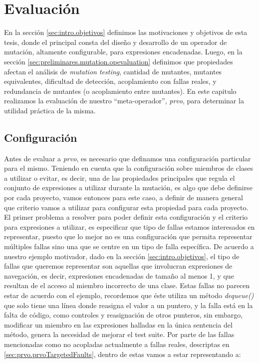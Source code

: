 \chapter[Evaluaci\'on]{Evaluaci\'on}
\label{cap:evaluation}

En la secci\'on \ref{sec:intro.objetivos} definimos las motivaciones y objetivos de esta tesis, donde el principal consta del dise\~no y desarrollo de un operador de mutaci\'on, altamente configurable, para expresiones encadenadas. Luego, en la secci\'on \ref{sec:preliminares.mutation.opevaluation} definimos que propiedades afectan el an\'alisis de \emph{mutation testing}, cantidad de mutantes, mutantes equivalentes, dificultad de detecci\'on, acoplamiento con fallas reales, y redundancia de mutantes (o acoplamiento entre mutantes). En este capitulo realizamos la evaluaci\'on de nuestro ``meta-operador'', \emph{prvo}, para determinar la utilidad pr\'actica de la misma.

\section{Configuraci\'on}
\label{sec:evaluation.prvoconfig}

Antes de evaluar a \emph{prvo}, es necesario que definamos una configuraci\'on particular para el mismo. Teniendo en cuenta que la configuraci\'on sobre miembros de clases a utilizar o evitar, es decir, una de las propiedades principales que regula el conjunto de expresiones a utilizar durante la mutaci\'on, es algo que debe definirse por cada proyecto, vamos entonces para este caso, a definir de manera general que criterio vamos a utilizar para configurar esta propiedad para cada proyecto. El primer problema a resolver para poder definir esta configuraci\'on y el criterio para expresiones a utilizar, es especificar que tipo de fallas estamos interesados en representar, puesto que lo mejor no es una configuraci\'on que permita representar m\'ultiples fallas sino una que se centre en un tipo de falla espec\'ifica. De acuerdo a nuestro ejemplo motivador, dado en la secci\'on \ref{sec:intro.objetivos}, el tipo de fallas que queremos representar son aquellas que involucran expresiones de navegaci\'on, es decir, expresiones encadenadas de tama\~no al menos 1, y que resultan de el acceso al miembro incorrecto de una clase. Estas fallas no parecen estar de acuerdo con el ejemplo, recordemos que \'este utiliza un m\'etodo \emph{dequeue()} que solo tiene una l\'inea donde reasigna el valor a un puntero, y la falla est\'a en la falta de c\'odigo, como controles y reasignaci\'on de otros punteros, sin embargo, modificar un miembro en las expresiones halladas en la \'unica sentencia del m\'etodo, genera la necesidad de mejorar el test suite. Por parte de las fallas mencionadas como no acopladas actualmente a fallas reales, descriptas en \ref{sec:prvo.prvoTargetedFaults}, dentro de estas vamos a estar representando a:

